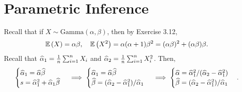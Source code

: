 \chapter{Parametric Inference}

\begin{ex}
  Recall that if $X\sim\text{Gamma}(\alpha,\beta)$, then by Exercise 3.12,
  \[
    \mathbb{E}\left(X\right)=\alpha\beta,\quad
    \mathbb{E}\left(X^2\right) =\alpha(\alpha+1)\beta^2
    =(\alpha\beta)^2+(\alpha\beta)\beta.
  \]
  Recall that $\widehat{\alpha}_1=\frac{1}{n}\sum_{i=1}^n X_i$ and
  $\widehat{\alpha}_2=\frac{1}{n}\sum_{i=1}^n X_i^2$. Then,
  \[
    \begin{cases}
      \widehat{\alpha}_1 = \widehat{\alpha}\widehat{\beta} \\
      s = \widehat{\alpha}_1^2+\widehat{\alpha}_1\widehat{\beta}
    \end{cases} \implies
    \begin{cases}
      \widehat{\alpha}_1 = \widehat{\alpha}\widehat{\beta} \\
      \widehat{\beta} = (\widehat{\alpha}_2 - \widehat{\alpha}_1^2)/\widehat{\alpha}_1
    \end{cases} \implies
    \begin{cases}
      \widehat{\alpha} = \widehat{\alpha}_1^2/(\widehat{\alpha}_2-\widehat{\alpha}_1^2) \\
      \widehat{\beta} = (\widehat{\alpha}_2-\widehat{\alpha}_1^2)/\widehat{\alpha}_1
    \end{cases}.
  \]
\end{ex}

